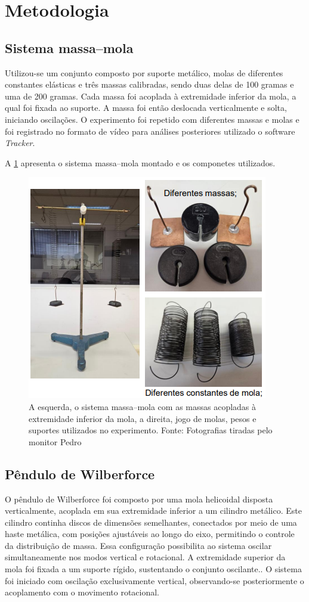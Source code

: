 \section{Metodologia}

\subsection{Sistema massa–mola}

Utilizou-se um conjunto composto por suporte metálico, molas de diferentes constantes elásticas e três massas calibradas, sendo duas delas de 100 gramas e uma de 200 gramas. Cada massa foi acoplada à extremidade inferior da mola, a qual foi fixada ao suporte. A massa foi então deslocada verticalmente e solta, iniciando oscilações. O experimento foi repetido com diferentes massas e molas e foi registrado no formato de vídeo para análises posteriores utilizado o software \textit{Tracker}.

A \cref{fig:massamola} apresenta o sistema massa–mola montado e os componetes utilizados.

\begin{figure}[H]
    \centering
    \includegraphics[width=0.35\linewidth]{fig/massamola.png}
    \caption{A esquerda, o sistema massa–mola com as massas acopladas à extremidade inferior da mola, a direita, jogo de molas, pesos e suportes utilizados no experimento. Fonte: Fotografias tiradas pelo monitor Pedro}
    \label{fig:massamola}
\end{figure}

\subsection{Pêndulo de Wilberforce}

O pêndulo de Wilberforce foi composto por uma mola helicoidal disposta verticalmente, acoplada em sua extremidade inferior a um cilindro metálico. Este cilindro continha discos de dimensões semelhantes, conectados por meio de uma haste metálica, com posições ajustáveis ao longo do eixo, permitindo o controle da distribuição de massa. Essa configuração possibilita ao sistema oscilar simultaneamente nos modos vertical e rotacional. A extremidade superior da mola foi fixada a um suporte rígido, sustentando o conjunto oscilante.. O sistema foi iniciado com oscilação exclusivamente vertical, observando-se posteriormente o acoplamento com o movimento rotacional.

